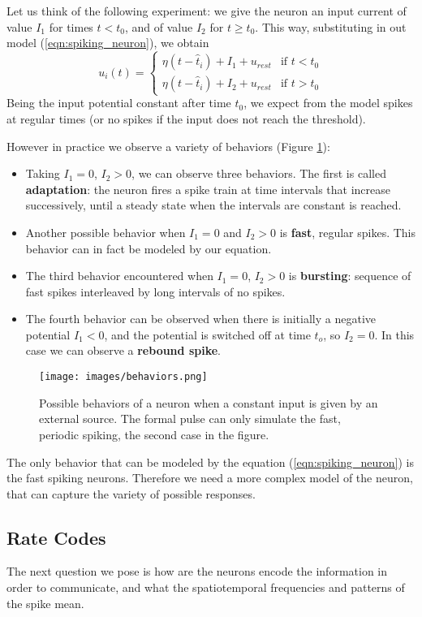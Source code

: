 \documentclass[oneside]{book}
\theoremstyle{definition}
\theoremstyle{plain}
\begin{document}
Let us think of the following experiment: we give the neuron an input current of value $I_1$ for times $t<t_0$, and of value $I_2$ for $t\geq t_0$. This way, substituting in out model (\ref{eqn:spiking_neuron}), we obtain 
\[
    u_i(t)=
    \begin{cases}
        \eta(t-\hat{t}_i) +I_1+ u_{rest} & \text{if } t<t_0 \\
        \eta(t-\hat{t}_i) +I_2+ u_{rest} & \text{if } t>t_0
    \end{cases}
\]
Being the input potential constant after time $t_0$, we expect from the model spikes at regular times (or no spikes if the input does not reach the threshold).

However in practice we observe a variety of behaviors (Figure \ref{fig:behaviors}):
\begin{itemize}
    \item Taking $I_1=0$, $I_2>0$, we can observe three behaviors. The first is called \textbf{adaptation}: the neuron fires a spike train at time intervals that increase successively, until a steady state when the intervals are constant is reached. 
    \item Another possible behavior when $I_1=0$ and $I_2>0$ is \textbf{fast}, regular spikes. This behavior can in fact be modeled by our equation.
    \item The third behavior encountered when $I_1=0$, $I_2>0$ is \textbf{bursting}: sequence of fast spikes interleaved by long intervals of no spikes.
    \item The fourth behavior can be observed when there is initially a negative potential $I_1<0$, and the potential is switched off at time $t_o$, so $I_2=0$. In this case we can observe a \textbf{rebound spike}.

\end{itemize}

\begin{figure}
    \centering
    \texttt{[image: images/behaviors.png]}
    \caption{Possible behaviors of a neuron when a constant input is given by an external source. The formal pulse can only simulate the fast, periodic spiking, the second case in the figure.}
    \label{fig:behaviors}
\end{figure}
The only behavior that can be modeled by the equation (\ref{eqn:spiking_neuron}) is the fast spiking neurons. Therefore we need a more complex model of the neuron, that can capture the variety of possible responses.

\subsection{Rate Codes}
The next question we pose is how are the  neurons encode the information in order to communicate, 
and what the spatiotemporal frequencies and patterns of the spike mean.
\end{document}
